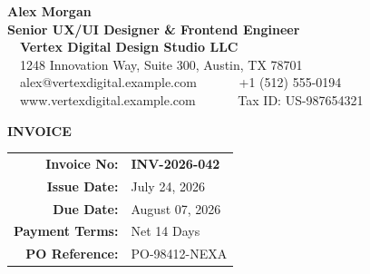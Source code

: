 \documentclass[10pt,a4paper]{article}
\begin{document}

\vspace*{-4mm}

\begin{minipage}[t]{0.56\textwidth}
    {\raggedright
        {\Huge \bfseries \color{PrimaryDark} Alex Morgan}\\[2pt]
        {\large \bfseries \color{AccentBright} Senior UX/UI Designer \& Frontend Engineer}\\[4pt]
        \color{SecondaryGray}\small
        \faBuilding\ \ \textbf{Vertex Digital Design Studio LLC}\\
        \faMapMarker\ \ 1248 Innovation Way, Suite 300, Austin, TX 78701\\
        \faEnvelope\ \ alex@vertexdigital.example.com \ \ \textbar\ \ \faPhone\ \ +1 (512) 555-0194\\
        \faGlobe\ \ www.vertexdigital.example.com \ \ \textbar\ \ \faIdCard\ \ Tax ID: US-987654321
    }
\end{minipage}%
\hfill
\begin{minipage}[t]{0.40\textwidth}
    {\raggedleft
        {\Huge \bfseries \color{AccentColor} INVOICE}\\[2pt]
        \begin{tcolorbox}[colback=AccentLight, colframe=AccentBright!30, arc=3.5pt, top=4pt, bottom=4pt, left=6pt, right=6pt]
            \small
            \begin{tabular}{@{}r l@{}}
                \textbf{\color{PrimaryDark} Invoice No:} & \textbf{\color{AccentBright} INV-2026-042} \\
                \textbf{\color{PrimaryDark} Issue Date:} & July 24, 2026 \\
                \textbf{\color{PrimaryDark} Due Date:} & August 07, 2026 \\
                \textbf{\color{PrimaryDark} Payment Terms:} & Net 14 Days \\
                \textbf{\color{PrimaryDark} PO Reference:} & PO-98412-NEXA
            \end{tabular}
        \end{tcolorbox}
    }
\end{minipage}
\end{document}
